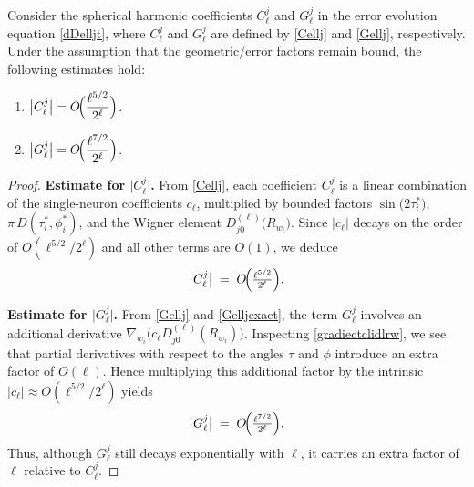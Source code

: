 \documentclass[review,onefignum,onetabnum,onealgnum]{siamart250106}
\numberwithin{theorem}{section}
\begin{document}
\begin{lemma}
\label{thm:decayrates-trainedweights}
Consider the spherical harmonic coefficients \(C_{\ell}^j\) and \(G_{\ell}^j\) in the error evolution equation \eqref{dDelljt}, where \(C_{\ell}^j\) and \(G_{\ell}^j\) are defined by \eqref{Cellj} and \eqref{Gellj}, respectively.  Under the assumption that the geometric/error factors remain bound, the following estimates hold:
\begin{enumerate}
\item 
\(\bigl|C_{\ell}^j\bigr| = O\!\Bigl(\dfrac{\ell^{5/2}}{2^\ell}\Bigr)\).
\item 
\(\bigl|G_{\ell}^j\bigr| = O\!\Bigl(\dfrac{\ell^{7/2}}{2^\ell}\Bigr)\).
\end{enumerate}
\end{lemma}

\begin{proof}
\textbf{Estimate for \(\bigl|C_{\ell}^j\bigr|\).}
From \eqref{Cellj}, each coefficient \(C_{\ell}^j\) is a linear combination of the single-neuron coefficients \(c_{\ell}\), multiplied by bounded factors \(\sin\bigl(2\tau_i^*\bigr)\), \(\pi\,D(\tau_i^*,\phi_i^*)\), and the Wigner element \(D_{j0}^{(\ell)}\bigl(R_{w_i}\bigr)\).  Since \(\bigl|c_{\ell}\bigr|\) decays on the order of \(O(\ell^{5/2}/2^\ell)\) and all other terms are \(O(1)\), we deduce
\[
\bigl|C_{\ell}^j\bigr|
\;=\;
O\!\Bigl(\tfrac{\ell^{5/2}}{2^\ell}\Bigr).
\]

\noindent
\textbf{Estimate for \(\bigl|G_{\ell}^j\bigr|\).}
From \eqref{Gellj} and \eqref{Gelljexact}, the term \(G_{\ell}^j\) involves an additional derivative 
\(\nabla_{w_i}\bigl(c_{\ell}D_{j0}^{(\ell)}(R_{w_i})\bigr)\).  
Inspecting \eqref{gradiectclidlrw}, we see that partial derivatives with respect to the angles \(\tau\) and \(\phi\) introduce an extra factor of \(O(\ell)\).  
Hence multiplying this additional factor by the intrinsic \(\bigl|c_{\ell}\bigr|\approx O(\ell^{5/2}/2^\ell)\) yields 
\[
\bigl|G_{\ell}^j\bigr|
\;=\;
O\!\Bigl(\tfrac{\ell^{7/2}}{2^\ell}\Bigr).
\]
Thus, although \(G_{\ell}^j\) still decays exponentially with \(\ell\), it carries an extra factor of \(\ell\) relative to \(C_{\ell}^j\).
\end{proof}
\end{document}
